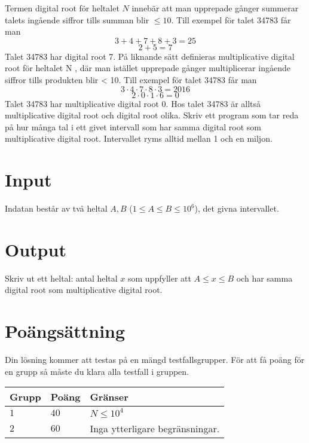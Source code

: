 Termen digital root för heltalet $N$ innebär att man upprepade gånger summerar talets
ingående siffror tills summan blir $\le 10$. Till exempel för talet 34783 får man
$$3 + 4 + 7 + 8 + 3 = 25$$
$$2+5=7$$
Talet 34783 har digital root 7.
På liknande sätt definieras multiplicative digital root för heltalet N , där man istället
upprepade gånger multiplicerar ingående siffror tills produkten blir < 10. Till exempel
för talet 34783 får man
$$3 \cdot 4 \cdot 7 \cdot 8 \cdot 3 = 2016$$
$$2 \cdot 0 \cdot 1 \cdot 6 = 0$$
Talet 34783 har multiplicative digital root 0. Hos talet 34783 är alltså multiplicative
digital root och digital root olika.
Skriv ett program som tar reda på hur många tal i ett givet intervall som har samma
digital root som multiplicative digital root. Intervallet ryms alltid mellan 1 och en
miljon.

\section*{Input}
Indatan består av två heltal $A,B$ ($1 \le A \le B \le 10^6$), det givna intervallet.

\section*{Output}
Skriv ut ett heltal: antal heltal $x$ som uppfyller att $A \leq x \leq B$ och har samma digital root som multiplicative digital root.

\section*{Poängsättning}
Din lösning kommer att testas på en mängd testfallsgrupper.
För att få poäng för en grupp så måste du klara alla testfall i gruppen.

\noindent
\begin{tabular}{| l | l | p{12cm} |}
  \hline
  \textbf{Grupp} & \textbf{Poäng} & \textbf{Gränser} \\ \hline
  $1$    & $40$          & $N \leq 10^4$  \\ \hline
  $2$    & $60$          & Inga ytterligare begränsningar.  \\ \hline
\end{tabular}
